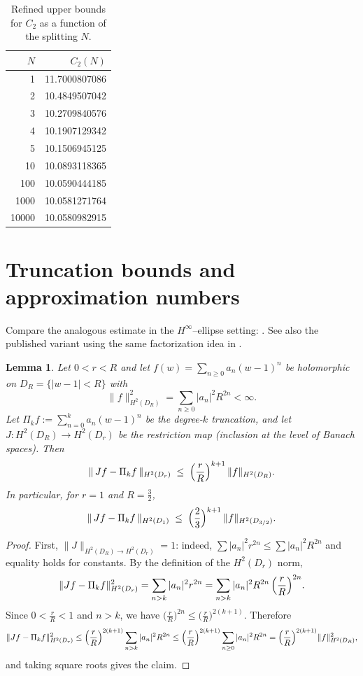 \documentclass[11pt]{article}
\newtheorem{lemma}[definition]{Lemma}
\begin{document}
\begin{table}[h]
\centering
\begin{tabular}{r r}
\hline
$N$ & $C_2(N)$ \\ \hline
1 & 11.7000807086 \\
2 & 10.4849507042 \\
3 & 10.2709840576 \\
4 & 10.1907129342 \\
5 & 10.1506945125 \\
10 & 10.0893118365 \\
100 & 10.0590444185 \\
1000 & 10.0581271764 \\
10000 & 10.0580982915 \\
\hline
\end{tabular}
\caption{Refined upper bounds for \(C_2\) as a function of the splitting \(N\).}\label{tab:C2-bounds}
\end{table}


\section{Truncation bounds and approximation numbers}


Compare the analogous estimate in the $H^\infty$–ellipse setting: \cite[Thm.~3.3(ii)]{BandtlowSlipantschuk2020}. 
See also the published variant using the same factorization idea in \cite{BandtlowPohlSchickWeisse2021}.

\begin{lemma}
\label{lem:H2-tail}
Let \(0<r<R\) and let \(f(w)=\sum_{n\ge0} a_n (w-1)^n\) be holomorphic on \(D_R=\{|w-1|<R\}\) with
\[
\|f\|_{H^2(D_R)}^2=\sum_{n\ge0} |a_n|^2 R^{2n}<\infty.
\]
Let \(\Pi_k f:=\sum_{n=0}^k a_n (w-1)^n\) be the degree-\(k\) truncation, and let
\(J:H^2(D_R)\to H^2(D_r)\) be the restriction map (inclusion at the level of Banach spaces). Then
\[
\|\,Jf-\Pi_k f\,\|_{H^2(D_r)}
\;\le\;
\Bigl(\frac{r}{R}\Bigr)^{k+1}\,\|f\|_{H^2(D_R)}.
\]
In particular, for \(r=1\) and \(R=\tfrac32\),
\[
\|\,Jf-\Pi_k f\,\|_{H^2(D_1)}
\;\le\;
\Bigl(\frac{2}{3}\Bigr)^{k+1}\,\|f\|_{H^2(D_{3/2})}.
\]
\end{lemma}

\begin{proof}
First, \(\|J\|_{H^2(D_R)\to H^2(D_r)}=1\): indeed,
\(\sum |a_n|^2 r^{2n}\le \sum |a_n|^2 R^{2n}\) and equality holds for constants.
By the definition of the \(H^2(D_r)\) norm,
\[
\|Jf-\Pi_k f\|_{H^2(D_r)}^2
=\sum_{n>k} |a_n|^2 r^{2n}
=\sum_{n>k} |a_n|^2 R^{2n}\,\Bigl(\frac{r}{R}\Bigr)^{2n}.
\]
Since \(0<\frac{r}{R}<1\) and \(n>k\), we have
\(\bigl(\frac{r}{R}\bigr)^{2n}\le \bigl(\frac{r}{R}\bigr)^{2(k+1)}\). Therefore
\[
\|Jf-\Pi_k f\|_{H^2(D_r)}^2
\le \Bigl(\frac{r}{R}\Bigr)^{2(k+1)} \sum_{n>k} |a_n|^2 R^{2n}
\le \Bigl(\frac{r}{R}\Bigr)^{2(k+1)} \sum_{n\ge0} |a_n|^2 R^{2n}
= \Bigl(\frac{r}{R}\Bigr)^{2(k+1)} \|f\|_{H^2(D_R)}^2,
\]
and taking square roots gives the claim.
\end{proof}
\end{document}
